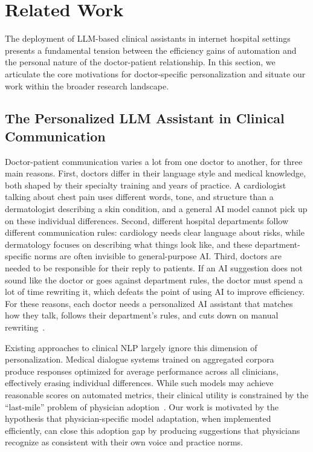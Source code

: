 ﻿\section*{Related Work}\label{section:motivation}

The deployment of LLM-based clinical assistants in internet hospital settings presents a fundamental tension between the efficiency gains of automation and the personal nature of the doctor-patient relationship. In this section, we articulate the core motivations for doctor-specific personalization and situate our work within the broader research landscape.

\subsection*{The Personalized LLM Assistant in Clinical Communication}

Doctor-patient communication varies a lot from one doctor to another, for three main reasons. First, doctors differ in their language style and medical knowledge, both shaped by their specialty training and years of practice. A cardiologist talking about chest pain uses different words, tone, and structure than a dermatologist describing a skin condition, and a general AI model cannot pick up on these individual differences. Second, different hospital departments follow different communication rules: cardiology needs clear language about risks, while dermatology focuses on describing what things look like, and these department-specific norms are often invisible to general-purpose AI. Third, doctors are needed to be responsible for their reply to patients. If an AI suggestion does not sound like the doctor or goes against department rules, the doctor must spend a lot of time rewriting it, which defeats the point of using AI to improve efficiency. For these reasons, each doctor needs a personalized AI assistant that matches how they talk, follows their department's rules, and cuts down on manual rewriting~\cite{Johnson2021Precision}.

Existing approaches to clinical NLP largely ignore this dimension of personalization. Medical dialogue systems trained on aggregated corpora~\cite{zengMedDialogLargescaleMedical2020,moorFoundationModelsGeneralist2023} produce responses optimized for average performance across all clinicians, effectively erasing individual differences. While such models may achieve reasonable scores on automated metrics, their clinical utility is constrained by the ``last-mile'' problem of physician adoption~\cite{info:doi/10.2196/jmir.7854,rajpurkarAIHealthMedicine2022a}. Our work is motivated by the hypothesis that physician-specific model adaptation, when implemented efficiently, can close this adoption gap by producing suggestions that physicians recognize as consistent with their own voice and practice norms.

